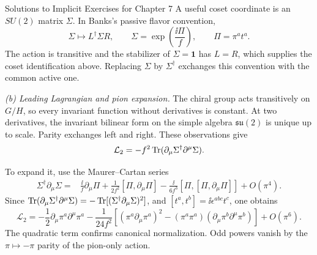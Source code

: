 \begin{bankssolutions}{Solutions to Implicit Exercises for Chapter 7}
A useful coset coordinate is an $SU(2)$ matrix $\Sigma$.  In Banks's passive
flavor convention,
\[
 \Sigma\longmapsto L^\dagger\Sigma R,\qquad
 \Sigma=\exp\left(\frac{\ii\Pi}{f}\right),\qquad
 \Pi=\pi^at^a.
\]
The action is transitive and the stabilizer of $\Sigma=\mathbf1$ has $L=R$,
which supplies the coset identification above.  Replacing $\Sigma$ by
$\Sigma^\dagger$ exchanges this convention with the common active one.

\textit{(b) Leading Lagrangian and pion expansion.}
The chiral group acts transitively on $G/H$, so every invariant function
without derivatives is constant.  At two derivatives, the invariant
bilinear form on the simple algebra $\mathfrak{su}(2)$ is unique up to scale.
Parity exchanges left and right.  These observations give
\[
 \mathcal L_2=-f^2\operatorname{Tr}(\partial_\mu\Sigma^\dagger
 \partial^\mu\Sigma).
\]

To expand it, use the Maurer--Cartan series
\begin{align*}
 \Sigma^\dagger\partial_\mu\Sigma
 ={}&\frac{\ii}{f}\partial_\mu\Pi
 +\frac{1}{2f^2}[\Pi,\partial_\mu\Pi]
 -\frac{\ii}{6f^3}[\Pi,[\Pi,\partial_\mu\Pi]]+O(\pi^4).
\end{align*}
Since
$\operatorname{Tr}(\partial_\mu\Sigma^\dagger\partial^\mu\Sigma)
=-\operatorname{Tr}[(\Sigma^\dagger\partial_\mu\Sigma)^2]$, and
$[t^a,t^b]=\ii\epsilon^{abc}t^c$, one obtains
\begin{equation*}
 \boxed{\mathcal L_2
 =-\frac12\partial_\mu\pi^a\partial^\mu\pi^a
 -\frac{1}{24f^2}\left[
 (\pi^a\partial_\mu\pi^a)^2
 -(\pi^a\pi^a)(\partial_\mu\pi^b\partial^\mu\pi^b)
 \right]+O(\pi^6).}
\end{equation*}
The quadratic term confirms canonical normalization.  Odd powers vanish by
the $\pi\mapsto-\pi$ parity of the pion-only action.


\end{bankssolutions}
